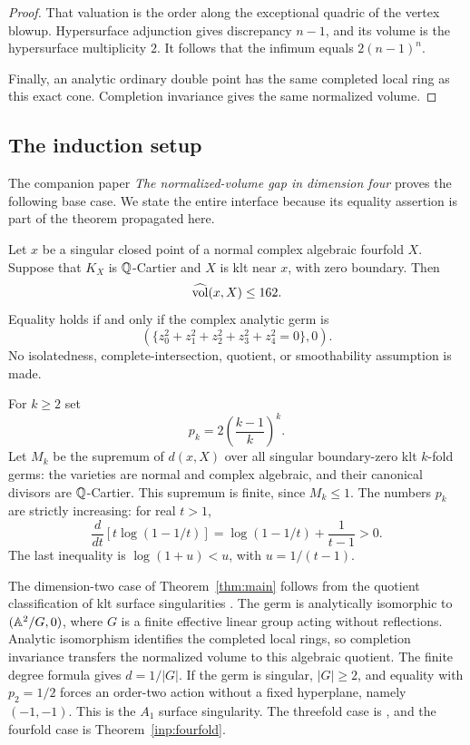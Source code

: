 \begin{proof}
That valuation is the order along the exceptional
quadric of the vertex blowup. Hypersurface adjunction
gives discrepancy \(n-1\), and its volume is the
hypersurface multiplicity \(2\). It follows that the
infimum equals \(2(n-1)^n\).

Finally, an analytic ordinary double point has the
same completed local ring as this exact cone.
Completion invariance \cite[Lemma~2.15]{Liu22}
gives the same normalized volume.
\end{proof}

\subsection{The induction setup}

The companion paper \emph{The normalized-volume gap in dimension four}
\cite[Theorem~1.1]{FourfoldCompanion} proves the following base case.
We state the entire interface because its equality assertion is part
of the theorem propagated here.

\begin{theorem}\label{inp:fourfold}
Let \(x\) be a singular closed point of a normal complex algebraic
fourfold \(X\). Suppose that \(K_X\) is \(\mathbb Q\)-Cartier and \(X\) is klt
near \(x\), with zero boundary. Then
\[
                  \widehat{\operatorname{vol}}(x,X)\le162.
\]
Equality holds if and only if the complex analytic germ is
\[
       \left(\{z_0^2+z_1^2+z_2^2+z_3^2+z_4^2=0\},0\right).
\]
No isolatedness, complete-intersection, quotient, or smoothability
assumption is made.
\end{theorem}

For \(k\ge2\) set
\begin{equation}\label{cone:eq-threshold}
              p_k=2\left(\frac{k-1}{k}\right)^k.
\end{equation}
Let \(M_k\) be the supremum of \(d(x,X)\) over all singular
boundary-zero klt \(k\)-fold germs: the varieties are normal and
complex algebraic, and their canonical divisors are
\(\mathbb Q\)-Cartier. This supremum is finite, since \(M_k\le1\).
The numbers \(p_k\) are strictly increasing: for real \(t>1\),
\[
 \frac{d}{dt}\left[t\log(1-1/t)\right]
   =\log(1-1/t)+\frac1{t-1}>0.
\]
The last inequality is \(\log(1+u)<u\), with \(u=1/(t-1)\).

The dimension-two case of Theorem~\ref{thm:main} follows from
the quotient classification of klt surface singularities
\cite[Proposition~6.11]{CKM88}. The germ is analytically isomorphic to
\((\mathbb A^2/G,0)\), where \(G\) is a finite effective linear group
acting without reflections. Analytic isomorphism identifies the
completed local rings, so completion invariance transfers the
normalized volume to this algebraic quotient. The finite
degree formula gives \(d=1/|G|\). If the germ is singular,
\(|G|\ge2\), and equality with \(p_2=1/2\) forces an order-two
action without a fixed hyperplane, namely \((-1,-1)\).
This is the \(A_1\) surface singularity. The threefold case is
\cite[Theorem~1.3(1)]{LX19}, and the fourfold case is
Theorem~\ref{inp:fourfold}.

